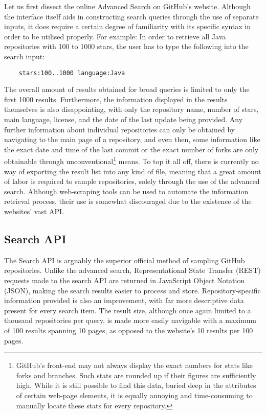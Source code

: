 Let us first dissect the online Advanced Search on GitHub's website.
Although the interface itself aids in constructing search queries through the use of separate inputs, it does require a certain degree of familiarity with its specific syntax in order to be utilised properly.
For example: In order to retrieve all Java repositories with 100 to 1000 stars, the user has to type the following into the search input:
\begin{verbatim}
    stars:100..1000 language:Java
\end{verbatim}
The overall amount of results obtained for broad queries is limited to only the first 1000 results.
Furthermore, the information displayed in the results themselves is also disappointing, with only the repository name, number of stars, main language, license, and the date of the last update being provided.
Any further information about individual repositories can only be obtained by navigating to the main page of a repository, and even then, some information like the exact date and time of the last commit or the exact number of forks are only obtainable through unconventional\footnote{GitHub's front-end may not always display the exact numbers for stats like forks and branches.
Such stats are rounded up if their figures are sufficiently high.
While it is still possible to find this data, buried deep in the attributes of certain web-page elements, it is equally annoying and time-consuming to manually locate these stats for every repository.} means.
To top it all off, there is currently no way of exporting the result list into any kind of file, meaning that a great amount of labor is required to sample repositories, solely through the use of the advanced search.
Although web-scraping tools can be used to automate the information retrieval process, their use is somewhat discouraged due to the existence of the websites' vast API\@.

\subsection{Search API}

The Search API is arguably the superior official method of sampling GitHub repositories.
Unlike the advanced search, Representational State Transfer (REST) requests made to the search API are returned in JavaScript Object Notation (JSON), making the search results easier to process and store.
Repository-specific information provided is also an improvement, with far more descriptive data present for every search item.
The result size, although once again limited to a thousand repositories per query, is made more easily navigable with a maximum of 100 results spanning 10 pages, as opposed to the website's 10 results per 100 pages.

